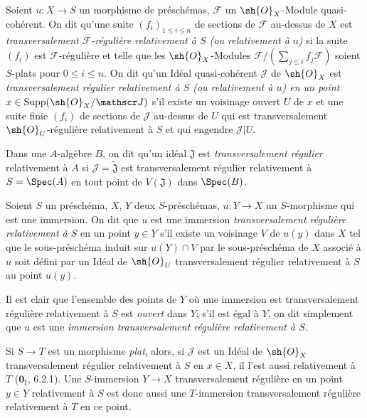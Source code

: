 \begin{definition}[19.2.1]
Soient $u:X\to S$ un morphisme de préschémas, $\mathscr F$ un $\sh{O}_X$-Module quasi-cohérent. On dit qu'une suite $(f_i)_{1\leq i\leq n}$ de sections de $\mathscr F$ au-dessus de $X$ est \emph{transversalement $\mathscr F$-régulière relativement à $S$ (\emph{ou} relativement à $u$)} si la suite $(f_i)$ est $\mathscr F$-régulière et telle que les $\sh{O}_X$-Modules $\mathscr F/(\sum_{j\leq i}f_j\mathscr F)$ soient $S$-plats pour $0\leq i\leq n$. On dit qu'un Idéal quasi-cohérent $\mathscr J$ de $\sh{O}_X$ est \emph{transversalement régulier relativement à $S$ (\emph{ou} relativement à $u$) en un point} $x\in\operatorname{Supp}(\sh{O}_X/\mathscr J)$ s'il existe un voisinage ouvert $U$ de $x$ et une suite finie $(f_i)$ de sections de $\mathscr J$ au-dessus de $U$ qui est transversalement $\sh{O}_U$-régulière relativement à $S$ et qui engendre $\mathscr J|U$.
\end{definition}

Dans une $A$-algèbre $B$, on dit qu'un idéal $\mathfrak J$ est \emph{transversalement régulier} relativement à $A$ si $\mathscr J=\widetilde{\mathfrak J}$ est transversalement régulier relativement à $S=\Spec(A)$ en tout point de $V(\mathfrak J)$ dans $\Spec(B)$.

\begin{definition}[19.2.2]
Soient $S$ un préschéma, $X$, $Y$ deux $S$-préschémas, $u:Y\to X$ un $S$-morphisme qui est une immersion. On dit que $u$ est une immersion \emph{transversalement régulière relativement à $S$} en un point $y\in Y$ s'il existe un voisinage $V$ de $u(y)$ dans $X$ tel que le sous-préschéma induit sur $u(Y)\cap V$ par le sous-préschéma de $X$ associé à $u$ soit défini par un Idéal de $\sh{O}_U$ transversalement régulier relativement à $S$ au point $u(y)$.
\end{definition}

Il est clair que l'ensemble des points de $Y$ où une immersion est transversalement régulière relativement à $S$ est \emph{ouvert} dans $Y$; s'il est égal à $Y$, on dit simplement que $u$ est une \emph{immersion transversalement régulière relativement à $S$}.

Si $S\to T$ est un morphisme \emph{plat}, alors, si $\mathscr J$ est un Idéal de $\sh{O}_X$ transversalement régulier relativement à $S$ en $x\in X$, il l'est aussi relativement à $T$ ($\mathbf{0}_{\mathrm I}$, 6.2.1). Une $S$-immersion $Y\to X$ transversalement régulière en un point $y\in Y$ relativement à $S$ est donc aussi une $T$-immersion transversalement régulière relativement à $T$ en ce point.

